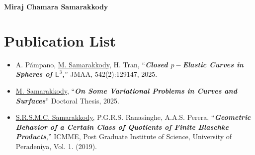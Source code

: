 \documentclass[12pt]{book}
\begin{document}
\begin{center}
\textbf{\Huge{Miraj Chamara Samarakkody}}\\
\end{center}

\section*{Publication List}

\begin{itemize}
	\item A. P\'ampano, \underline{M. Samarakkody}, H. Tran, ``\textit{\textbf{Closed $p-$Elastic Curves in Spheres of $\mathbb{L}^{3}$,}}'' JMAA, 542(2):129147, 2025. 
	\item \underline{M. Samarakkody}, ``\textit{\textbf{On Some Variational Problems in Curves and Surfaces}}'' Doctoral Thesis, 2025. 
 \item \underline{S.R.S.M.C. Samarakkody}, P.G.R.S. Ranasinghe, A.A.S. Perera, ``\textit{\textbf{Geometric Behavior of a Certain Class of Quotients of Finite Blaschke Products}},'' ICMME, Post Graduate Institute of Science, University of Peradeniya, Vol. 1. (2019).
\end{itemize}
\end{document}
